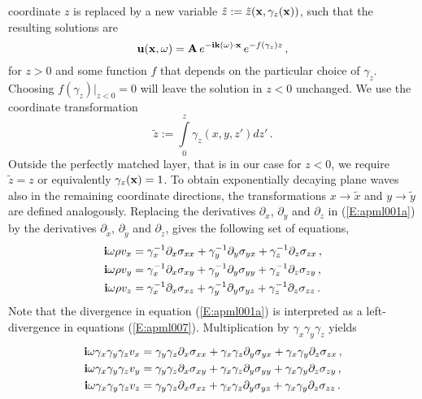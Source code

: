 coordinate $z$ is replaced by a new variable
$\tilde{z}:=\tilde{z}(\mathbf{x},\gamma_z(\mathbf{x}))$, such that the
resulting solutions are
\begin{equation}\label{E:apml005}
\mathbf{u}(\mathbf{x}, \omega)=
\mathbf{A}\,e^{-\mathbf{i}\mathbf{k}(\omega)\cdot\mathbf{x}}\,e^{-f(\gamma_z) z}\,,
\end{equation}
for $z>0$ and some function $f$ that depends on the particular
choice of $\gamma_z$. Choosing $f(\gamma_z)|_{z<0}=0$ will leave the
solution in $z<0$ unchanged. We use the coordinate transformation
\begin{equation}\label{E:apml006}
\tilde{z}:=\int\limits_{0}^{z} \gamma_z(x, y, z') dz'\,.
\end{equation}
Outside the perfectly matched layer, that is in our case for $z<0$,
we require $\tilde{z}=z$ or equivalently $\gamma_z(\mathbf{x})=1$. To
obtain exponentially decaying plane waves also in the remaining
coordinate directions, the transformations $x\to\tilde{x}$ and
$y\to\tilde{y}$ are defined analogously. Replacing the derivatives
$\partial_x$, $\partial_y$ and $\partial_z$ in (\ref{E:apml001a}) by
the derivatives $\partial_{\tilde{x}}$, $\partial_{\tilde{y}}$ and
$\partial_{\tilde{z}}$, gives the following set of equations,
\begin{subequations}\label{E:apml007}
\begin{align}
\mathbf{i}\omega\rho v_x &= \gamma_x^{-1} \partial_x \sigma_{xx} +
\gamma_y^{-1} \partial_y \sigma_{yx} + \gamma_z^{-1} \partial_z
\sigma_{zx}\,,\label{E:apml007a}\\
\mathbf{i}\omega\rho v_y &= \gamma_x^{-1} \partial_x \sigma_{xy} +
\gamma_y^{-1} \partial_y \sigma_{yy} + \gamma_z^{-1} \partial_z
\sigma_{zy}\,,\label{E:apml007b}\\
\mathbf{i}\omega\rho v_z &= \gamma_x^{-1} \partial_x \sigma_{xz} +
\gamma_y^{-1} \partial_y \sigma_{yz} + \gamma_z^{-1} \partial_z
\sigma_{zz}\,.\label{E:apml007c}
\end{align}
\end{subequations}
Note that the divergence in equation (\ref{E:apml001a}) is
interpreted as a left-divergence in equations (\ref{E:apml007}).
Multiplication by $\gamma_x \gamma_y \gamma_z$ yields
\begin{subequations}\label{E:apml008}
\begin{align}
\mathbf{i}\omega \gamma_x \gamma_y \gamma_z v_x &= \gamma_y \gamma_z
\partial_x \sigma_{xx} + \gamma_x \gamma_z \partial_y \sigma_{yx} +
\gamma_x \gamma_y \partial_z \sigma_{zx}\,,\label{E:apml008a}\\
\mathbf{i}\omega \gamma_x \gamma_y \gamma_z v_y &= \gamma_y \gamma_z
\partial_x \sigma_{xy} + \gamma_x \gamma_z \partial_y \sigma_{yy} +
\gamma_x \gamma_y \partial_z \sigma_{zy}\,,\label{E:apml008b}\\
\mathbf{i}\omega \gamma_x \gamma_y \gamma_z v_z &= \gamma_y \gamma_z
\partial_x \sigma_{xz} + \gamma_x \gamma_z \partial_y \sigma_{yz} +
\gamma_x \gamma_y \partial_z \sigma_{zz}\,.\label{E:apml008c}
\end{align}
\end{subequations}
